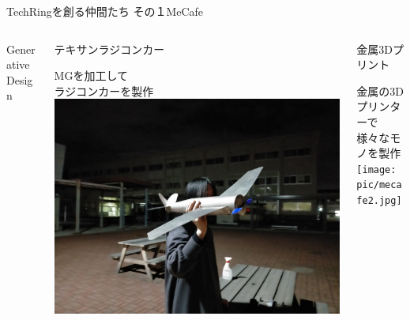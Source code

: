 \documentclass[dvipdfmx]{beamer}
\begin{document}
\begin{frame}{TechRingを創る仲間たち その１}{MeCafe}
\begin{columns}[totalwidth=1.02\textwidth]
\begin{column}{.3\textwidth}
\begin{footnotesize}
\begin{alertblock}{\normalsize Generative Design}
\begin{center}
            \end{center}
        \end{alertblock}
      \end{footnotesize}
    \end{column}
    \begin{column}{.3\textwidth}
      \begin{footnotesize}
        \begin{alertblock}{テキサンラジコンカー}
          \begin{center}
            MGを加工して\\
            ラジコンカーを製作\\
            \includegraphics[scale=.02]{pic/mecafe3.jpg}
          \end{center}
        \end{alertblock}
      \end{footnotesize}
    \end{column}
    \begin{column}{.3\textwidth}
      \begin{footnotesize}
        \begin{alertblock}{\normalsize 金属3Dプリント}
          \begin{center}
            金属の3Dプリンターで\\
            様々なモノを製作\\
            \texttt{[image: pic/mecafe2.jpg]}
          \end{center}
        \end{alertblock}
      \end{footnotesize}
    \end{column}
  \end{columns}


\end{frame}
\end{document}

